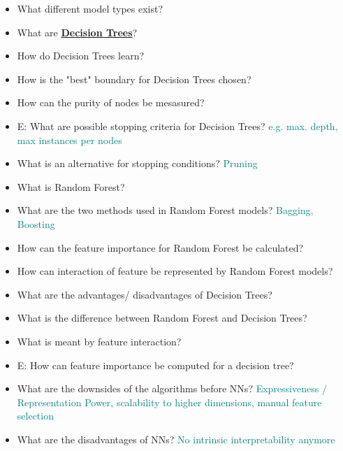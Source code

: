 \documentclass{report}
\newcommand{\asw}[2][teal]{}
\renewcommand{\asw}[2][teal]{\textcolor{#1}{#2}}
\begin{document}
	\begin{itemize}
		\item What different model types exist?
		\asw{\newline }
		
		\item What are \textbf{\underline{Decision Trees}}?
		\asw{\newline }
		\item How do Decision Trees learn?
		\asw{\newline }
		\item How is the "best" boundary for Decision Trees chosen?
		\asw{\newline }
		\item How can the purity of nodes be mesasured?
		\asw{\newline }
		\item E: What are possible stopping criteria for Decision Trees?
		\asw{\newline e.g. max. depth, max instances per nodes}
		\item What is an alternative for stopping conditions?
		\asw{\newline Pruning}
		\item What is Random Forest?
		\asw{\newline }
		\item What are the two methods used in Random Forest models?
		\asw{\newline Bagging, Boosting}
		\item How can the feature importance for Random Forest be calculated?
		\asw{\newline }
		\item How can interaction of feature be represented by Random Forest models?
		\asw{\newline }
		\item What are the advantages/ disadvantages of Decision Trees?
		\asw{\newline }
		\item What is the difference between Random Forest and Decision Trees?
		\asw{\newline }
		\item What is meant by feature interaction?
		\asw{\newline }
		\item E: How can feature importance be computed for a decision tree?
		\asw{\newline }
		
		\item What are the downsides of the algorithms before NNs?
		\asw{\newline Expressiveness / Representation Power, scalability to higher dimensions, manual feature selection}
		\item What are the disadvantages of NNs?
		\asw{\newline No intrinsic interpretability anymore}
		

\end{itemize}
\end{document}

